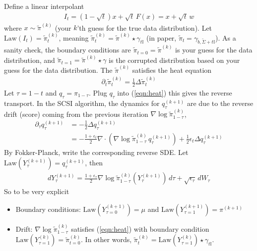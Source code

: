 \documentclass[12pt,fleqn]{article}
\numberwithin{equation}{section}
\begin{document}
Define a linear interpolant
\begin{align}
	I_t = (1 - \sqrt t ) x + \sqrt t \, F(x) = x + \sqrt t \, w
\end{align}
where $x \sim \tilde \pi^{(k)}$ (your $k$'th guess for the true data distribution). 
Let $\text{Law}(I_t) = \tilde \pi_t^{(k)}$, meaning $\tilde \pi_t^{(k)} = \tilde \pi^{(k)} \star \gamma_{t \mathbb I}$ (in paper, $\tilde \pi_t = \gamma_{\tilde b, \tilde \Sigma + t \mathbb I}$). As a sanity check, the boundary conditions are $\tilde \pi_{t=0} = \tilde \pi^{(k)}$ is your guess for the data distribution, and $\tilde \pi_{t=1} = \tilde \pi^{(k)} \star \gamma$ is the corrupted distribution based on your guess for the data distribution. The $\tilde \pi^{(k)}$ satisfies the heat equation
\begin{align}
	\partial_t \tilde \pi_t^{(k)} = \frac{1}{2}\Delta \tilde \pi_t^{(k)} \label{eqn:heat}
\end{align}
Let $\tau = 1 -t$ and $q_{\tau} = \pi_{1-\tau}$. Plug $q_\tau$ into (\ref{eqn:heat}) this gives the reverse transport. In the SCSI algorithm, the dynamics for $q^{(k+1)}_\tau$ are due to the reverse drift (score) coming from the previous iteration $\nabla \log \tilde \pi_{1-\tau}^{(k)}$,
\begin{align}
	\partial_\tau q_\tau^{(k+1)} & = - \frac{1}{2} \Delta q_\tau^{(k+1)}\\
	& = -\frac{1 + \epsilon_t}{2} \nabla \cdot (\nabla \log \tilde \pi_{1-\tau}^{(k)} \, q_\tau^{(k+1)}) + \frac 1 2 \epsilon_t \Delta q_\tau^{(k+1)}\end{align}
By Fokker-Planck, write the corresponding reverse SDE. Let $\text{Law}(Y_\tau^{(k+1)}) = q_\tau^{(k+1)}$, then
\begin{align}
	dY_\tau^{(k+1)} = \frac{1 + \epsilon_\tau}{2} \nabla \log \tilde \pi_{1-\tau}^{(k)} (Y_\tau^{(k+1)}) \, d\tau + \sqrt{\epsilon_\tau} \, dW_\tau
\end{align}
So to be very explicit
\begin{itemize}
	\item Boundary conditions: $\text{Law}(Y_{\tau = 0}^{(k+1)}) = \mu$ and $\text{Law}(Y_{\tau = 1}^{(k+1)}) = \pi^{(k+1)}$
	\item Drift: $\nabla \log \tilde \pi_{1-\tau}^{(k)}$ satisfies (\ref{eqn:heat}) with boundary condition $\text{Law}(Y_{\tau=1}^{(k)}) = \tilde \pi_{t=0}^{(k)}$. In other words, $\tilde \pi^{(k)}_t =\text{Law}(Y_{\tau = 1}^{(k)}) \star\gamma_{t \mathbb I}$.
\end{itemize}
\end{document}
